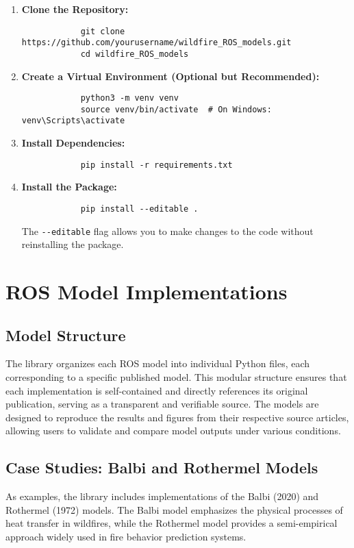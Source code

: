 \documentclass{article}
\begin{document}
	\begin{enumerate}
		\item \textbf{Clone the Repository:}
		\begin{verbatim}
			git clone https://github.com/yourusername/wildfire_ROS_models.git
			cd wildfire_ROS_models
		\end{verbatim}
		
		\item \textbf{Create a Virtual Environment (Optional but Recommended):}
		\begin{verbatim}
			python3 -m venv venv
			source venv/bin/activate  # On Windows: venv\Scripts\activate
		\end{verbatim}
		
		\item \textbf{Install Dependencies:}
		\begin{verbatim}
			pip install -r requirements.txt
		\end{verbatim}
		
		\item \textbf{Install the Package:}
		\begin{verbatim}
			pip install --editable .
		\end{verbatim}
		The \verb!--editable! flag allows you to make changes to the code without reinstalling the package.
	\end{enumerate}
	
	\section{ROS Model Implementations}
	\subsection{Model Structure}
	The library organizes each ROS model into individual Python files, each corresponding to a specific published model. This modular structure ensures that each implementation is self-contained and directly references its original publication, serving as a transparent and verifiable source. The models are designed to reproduce the results and figures from their respective source articles, allowing users to validate and compare model outputs under various conditions.
	
	\subsection{Case Studies: Balbi and Rothermel Models}
	As examples, the library includes implementations of the Balbi (2020) and Rothermel (1972) models. The Balbi model emphasizes the physical processes of heat transfer in wildfires, while the Rothermel model provides a semi-empirical approach widely used in fire behavior prediction systems.
	
\end{document}
